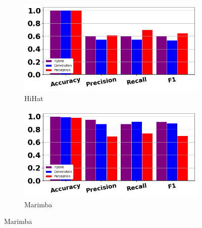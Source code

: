 \documentclass[12pt,letterpaper]{article}
\begin{document}
\begin{figure}[H]
	\begin{subfigure}[b]{0.45\textwidth}
	\centering
	\includegraphics[width=\textwidth]{../FiguresClasses/Hihat}
	\caption{HiHat}
	\end{subfigure}	
	\hfill
	\begin{subfigure}[b]{0.45\textwidth}
	\centering
	\includegraphics[width=\textwidth]{../FiguresClasses/Marimba}
	\caption{Marimba}
	\end{subfigure}	
	

\end{figure}
\end{document}
